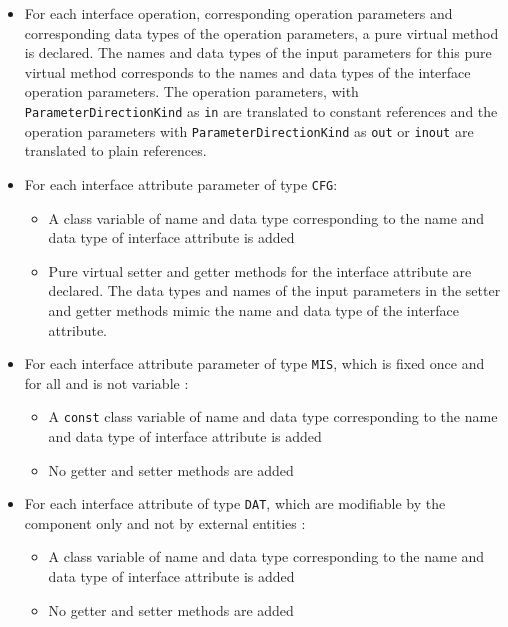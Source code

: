 \begin{itemize}
\item For each interface operation, corresponding operation parameters and corresponding data types of the operation parameters, a pure virtual method is declared. The names and data types of the input parameters for this pure virtual method corresponds to the names and data types of the interface operation parameters. The operation parameters, with \texttt{ParameterDirectionKind} as \texttt{in} are translated to constant references and the operation parameters with \texttt{ParameterDirectionKind} as \texttt{out} or \texttt{inout} are translated to plain references. 
\item For each interface attribute parameter of type \texttt{CFG}:
\begin{itemize}
\item A class variable of name and data type corresponding to the name and data type of interface attribute is added
\item Pure virtual setter and getter methods for the interface attribute are declared. The data types and names of the input parameters in the setter and getter methods mimic the name and data type of the interface attribute.
\end{itemize} 
\item For each interface attribute parameter of type \texttt{MIS}, which is fixed once and for all and is not variable \cite{SpecMetamodel}: 
\begin{itemize}
\item A \texttt{const} class variable of name and data type corresponding to the name and data type of interface attribute is added
\item No getter and setter methods are added
\end{itemize}
\item For each interface attribute of type \texttt{DAT}, which are modifiable by the component only and not by external entities \cite{SpecMetamodel}:
\begin{itemize}
\item A class variable of name and data type corresponding to the name and data type of interface attribute is added
\item No getter and setter methods are added  
\end{itemize}   
\end{itemize}

